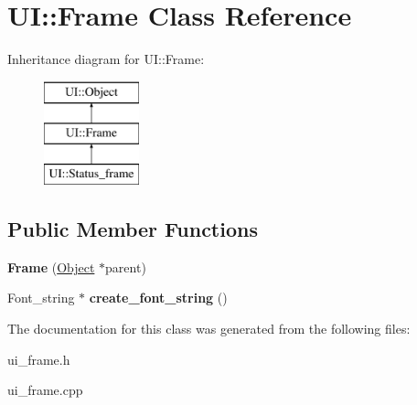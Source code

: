 \hypertarget{class_u_i_1_1_frame}{
\section{UI::Frame Class Reference}
\label{class_u_i_1_1_frame}
}
Inheritance diagram for UI::Frame:\begin{figure}[H]
\begin{center}
\leavevmode
\includegraphics[height=3.000000cm]{class_u_i_1_1_frame}
\end{center}
\end{figure}
\subsection*{Public Member Functions}
\begin{DoxyCompactItemize}
\item 
\hypertarget{class_u_i_1_1_frame_a601cf1fc860bdaafa50e5b2341c7df9d}{
{\bfseries Frame} (\hyperlink{class_u_i_1_1_object}{Object} $\ast$parent)}
\label{class_u_i_1_1_frame_a601cf1fc860bdaafa50e5b2341c7df9d}

\item 
\hypertarget{class_u_i_1_1_frame_a05701bfcf9b9a93bc7390617abbbeddb}{
Font\_\-string $\ast$ {\bfseries create\_\-font\_\-string} ()}
\label{class_u_i_1_1_frame_a05701bfcf9b9a93bc7390617abbbeddb}

\end{DoxyCompactItemize}


The documentation for this class was generated from the following files:\begin{DoxyCompactItemize}
\item 
ui\_\-frame.h\item 
ui\_\-frame.cpp\end{DoxyCompactItemize}

